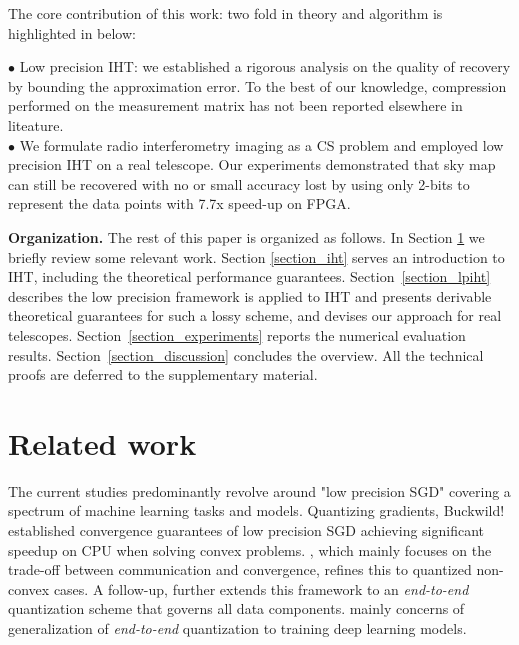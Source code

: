 \documentclass{article}
\begin{document}
 The core contribution of this work: two fold in theory and algorithm is highlighted in below: 
 
     $\bullet$ Low precision IHT: we established a rigorous analysis on the quality of recovery by bounding the approximation error. To the best of our knowledge, compression performed on the measurement matrix has not been reported elsewhere in liteature.\\
     $\bullet$ We formulate radio interferometry imaging as a CS problem and employed low precision IHT on a real telescope. Our experiments demonstrated that sky map can still be recovered with no or small accuracy lost by using only 2-bits to represent the data points with 7.7x speed-up on FPGA.
     
{\bf Organization. }
The rest of this paper is organized as follows. In Section \ref{section_related_work} we briefly review some relevant work. Section \ref{section_iht} serves an introduction to IHT, including the theoretical performance guarantees. Section~\ref{section_lpiht} describes the low precision framework is applied to IHT and presents derivable theoretical guarantees for such a lossy scheme, and devises our approach for real telescopes. Section~\ref{section_experiments} reports the numerical evaluation results. Section~\ref{section_discussion} concludes the overview. All the technical proofs are deferred to the supplementary material.
\section{Related work}\label{section_related_work}
The current studies predominantly revolve around "low precision SGD" covering a spectrum of machine learning tasks and models. Quantizing gradients, Buckwild!~\cite{desa2015hogwild} established convergence guarantees of low precision SGD achieving significant speedup on CPU when solving convex problems. \cite{alistarh2016qsgd}, which mainly focuses on the trade-off between communication and convergence, refines this to quantized non-convex cases. A follow-up, \cite{zhang2017zipml} further extends this framework to an {\it end-to-end} quantization scheme that governs all data components. \cite{seide2014sgd1bit, hubara2016qsnn, rastegari2016binarycnn,zhou2016cnn, miyashita2016cnn, li2016twn, gupta2015dl} mainly concerns of generalization of {\it end-to-end} quantization to training deep learning models. 
\end{document}
